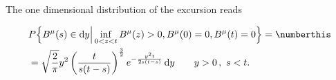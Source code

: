 The one dimensional distribution of the excursion reads

\begin{align*}
& P\Big\{ B^\mu(s) \in \mathrm d y \Big |  \inf_{ 0 < z < t } B^\mu(z) > 0, B^\mu(0) = 0, B^\mu(t) =0 \Big \} = \numberthis \label{eq:bmd-bdg-dft-0-0} \\
%
&=
\sqrt \frac{2}{\pi} y^2 \left(\frac{t}{s(t-s)}\right) ^\frac 32 
e^{- \frac{ y^2t}{ 2 s (t-s)}} \, \mathrm d y \qquad y>0 \,,\,\, s<t.
\end{align*}



%
%
%
%
%
%
%
%
%
